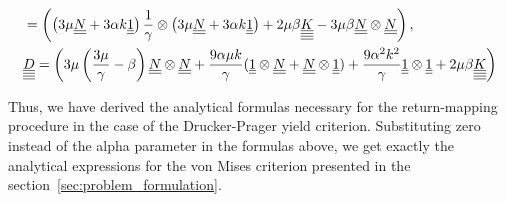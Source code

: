 \documentclass[12pt]{article}
\begin{document}
\begin{appendices}
\begin{align*}
        & = \left( \left( 3\mu \underline{\underline{N}} + 3\alpha k \underline{\underline{1}} \right) \frac{1}{\gamma} \otimes \left( 3\mu \underline{\underline{N}} + 3\alpha k \underline{\underline{1}} \right) + 2\mu\beta\underline{\underline{\underline{\underline{K}}}} - 3\mu\beta\underline{\underline{N}} \otimes \underline{\underline{N}} \right), \\
        & \underline{\underline{\underline{\underline{D}}}} = \left( 3\mu\left(\frac{3\mu}{\gamma} - \beta\right)\underline{\underline{N}} \otimes \underline{\underline{N}} + \frac{9\alpha\mu k}{\gamma} (\underline{\underline{1}} \otimes \underline{\underline{N}} + \underline{\underline{N}} \otimes \underline{\underline{1}}) + \frac{9\alpha^2k^2}{\gamma} \underline{\underline{1}} \otimes \underline{\underline{1}} + 2\mu\beta \underline{\underline{\underline{\underline{K}}}} \right)
    \end{align*}

    Thus, we have derived the analytical formulas necessary for the return-mapping procedure in the case of the Drucker-Prager yield criterion. Substituting zero instead of the alpha parameter in the formulas above, we get exactly the analytical expressions for the von Mises criterion presented in the section~\ref{sec:problem_formulation}.
\end{appendices}
\end{document}
